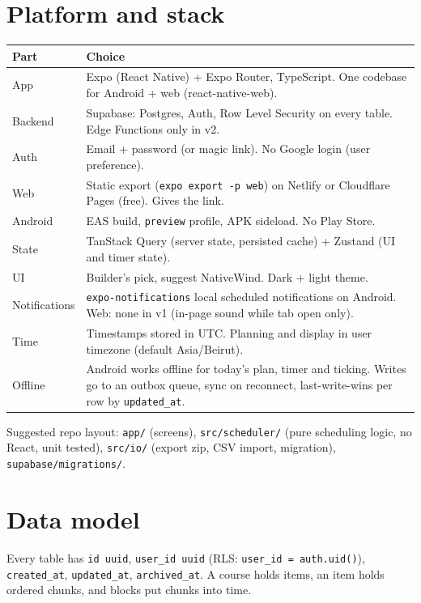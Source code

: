 \documentclass[11pt,a4paper]{article}
\newcommand{\code}[1]{\texttt{\small #1}}
\begin{document}
\section{Platform and stack}

\begin{longtable}{L{3cm}L{12.5cm}}
\toprule
\textbf{Part} & \textbf{Choice} \\
\midrule
\endhead
App & Expo (React Native) + Expo Router, TypeScript. One codebase for Android + web (react-native-web). \\
Backend & Supabase: Postgres, Auth, Row Level Security on every table. Edge Functions only in v2. \\
Auth & Email + password (or magic link). No Google login (user preference). \\
Web & Static export (\code{expo export -p web}) on Netlify or Cloudflare Pages (free). Gives the link. \\
Android & EAS build, \code{preview} profile, APK sideload. No Play Store. \\
State & TanStack Query (server state, persisted cache) + Zustand (UI and timer state). \\
UI & Builder's pick, suggest NativeWind. Dark + light theme. \\
Notifications & \code{expo-notifications} local scheduled notifications on Android. Web: none in v1 (in-page sound while tab open only). \\
Time & Timestamps stored in UTC. Planning and display in user timezone (default Asia/Beirut). \\
Offline & Android works offline for today's plan, timer and ticking. Writes go to an outbox queue, sync on reconnect, last-write-wins per row by \code{updated\_at}. \\
\bottomrule
\end{longtable}

Suggested repo layout: \code{app/} (screens), \code{src/scheduler/} (pure scheduling logic, no React, unit tested), \code{src/io/} (export zip, CSV import, migration), \code{supabase/migrations/}.

\section{Data model}

Every table has \code{id uuid}, \code{user\_id uuid} (RLS: \code{user\_id = auth.uid()}), \code{created\_at}, \code{updated\_at}, \code{archived\_at}. A course holds items, an item holds ordered chunks, and blocks put chunks into time.
\end{document}
